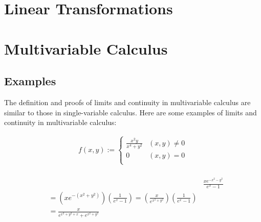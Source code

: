 \documentclass{article}
\begin{document}
\section{Linear Transformations}

\section{Multivariable Calculus}

\subsection{Examples}

The definition and proofs of limits and continuity in multivariable calculus are similar to those in single-variable calculus. Here are some examples of limits and continuity in multivariable calculus:

\begin{align}
    f(x,y) := 
    \begin{cases}
    \frac{x^2 y}{x^4 + y^2} & (x,y) \neq 0 \\
    0 & (x,y) = 0 \\
    \end{cases} \\
\end{align}

\begin{align}
    &&\frac{xe^{-x^{2}-y^{2}}}{e^x - 1} \\
    &= (xe^{-(x^2+y^2)})(\frac{1}{e^x - 1}) = (\frac{x}{e^{x^2+y^2}})(\frac{1}{e^x - 1}) \\
    &= \frac{x}{e^{x^2+y^2+x} + e^{x^2+y^2}}
\end{align}
\end{document}
